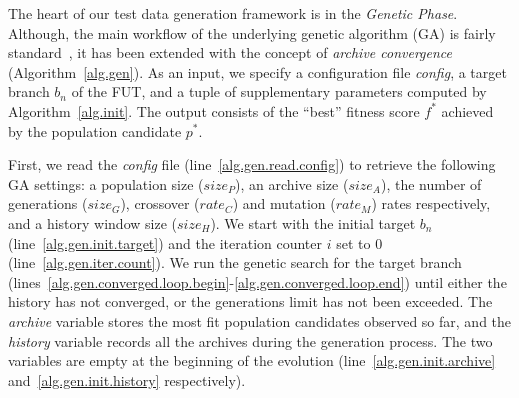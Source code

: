 \documentclass[sigconf,review]{acmart}
\begin{document}
The heart of our test data generation framework is in the \emph{Genetic Phase}. Although, the main workflow of the underlying genetic algorithm (GA) is fairly standard~\cite{poli2008field}, it has been extended with the concept of \emph{archive convergence} (Algorithm~\ref{alg.gen}). As an input, we specify a configuration file \emph{config}, a target branch $b_n$ of the FUT, and a tuple of supplementary parameters computed by Algorithm~\ref{alg.init}. The output consists of the ``best'' fitness score $f^*$ achieved by the population candidate $p^*$.

First, we read the \emph{config} file (line~\ref{alg.gen.read.config}) to retrieve the following GA settings: a population size  ($size_P$), an archive size ($size_A$), the number of generations ($size_G$), crossover ($rate_C$) and mutation ($rate_M$) rates respectively, and a history window size ($size_H$). We start with the initial target $b_n$ (line~\ref{alg.gen.init.target}) and the iteration counter $i$ set to 0 (line~\ref{alg.gen.iter.count}). We run the genetic search for the target branch (lines~\ref{alg.gen.converged.loop.begin}-\ref{alg.gen.converged.loop.end}) until either the history has not converged, or the generations limit has not been exceeded. The \emph{archive} variable stores the most fit population candidates observed so far, and the \emph{history} variable records all the archives during the generation process. The two variables are empty at the beginning of the evolution (line~\ref{alg.gen.init.archive} and~\ref{alg.gen.init.history} respectively). 
\end{document}
